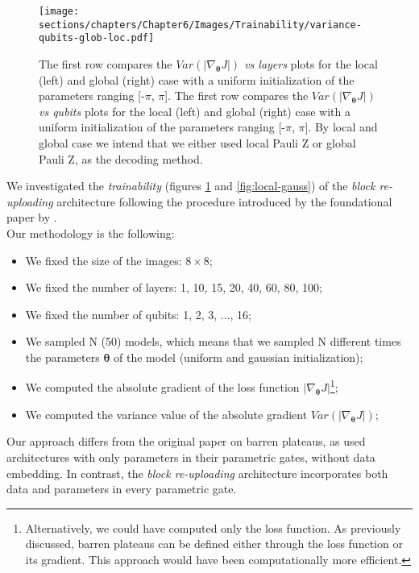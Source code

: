 \begin{figure}[h]
    \centering
    \texttt{[image: sections/chapters/Chapter6/Images/Trainability/variance-qubits-glob-loc.pdf]}
    \caption{The first row compares the \textit{$Var(|\nabla_{\bm{\theta}}J|)$ vs layers} plots for the local (left)
    and global (right) case with a uniform initialization of the parameters ranging [-$\pi$, $\pi$].
    The first row compares the \textit{$Var(|\nabla_{\bm{\theta}}J|)$ vs qubits} plots for the local (left)
    and global (right) case with a uniform initialization of the parameters ranging [-$\pi$, $\pi$].
    By local and global case we intend that we either used local Pauli Z or global Pauli Z, as the 
    decoding method.}
    \label{fig:uniform-init}
\end{figure}

We investigated the \textit{trainability} (figures \ref{fig:uniform-init} and \ref{fig:local-gauss}) 
of the \textit{block re-uploading} architecture following the procedure introduced by 
the foundational paper by \cite{McClean_2018}.\\
Our methodology is the following:

\begin{itemize}
    \item We fixed the size of the images: $8\times8$;
    \item We fixed the number of layers: 1, 10, 15, 20, 40, 60, 80, 100;
    \item We fixed the number of qubits: 1, 2, 3, ..., 16;
    \item We sampled N (50) models, which means that we sampled N different times the parameters 
    $\bm{\theta}$ of the model (uniform and gaussian initialization);
    \item We computed the absolute gradient of the loss function $|\nabla_{\bm{\theta}}J|$\footnote[1]{
        Alternatively, we could have computed only the loss function. As previously discussed, 
        barren plateaus can be defined either through the loss function or its gradient. 
        This approach would have been computationally more efficient.
    };
    \item We computed the variance value of the absolute gradient $Var(|\nabla_{\bm{\theta}}J|)$;
\end{itemize}

Our approach differs from the original paper on barren plateaus, as \cite{McClean_2018} 
used architectures with only parameters in their parametric gates, without data embedding. 
In contrast, the \textit{block re-uploading} architecture incorporates both data and parameters 
in every parametric gate.\\

